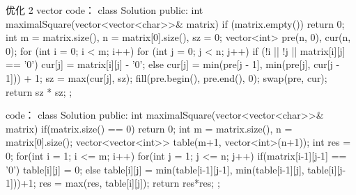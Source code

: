 优化 2 vector code：
class Solution {
public:
    int maximalSquare(vector<vector<char>>& matrix) {
        if (matrix.empty()) {
            return 0;
        }
        int m = matrix.size(), n = matrix[0].size(), sz = 0;
        vector<int> pre(n, 0), cur(n, 0);
        for (int i = 0; i < m; i++) {
            for (int j = 0; j < n; j++) {
                if (!i || !j || matrix[i][j] == '0') {
                    cur[j] = matrix[i][j] - '0';
                } else {
                    cur[j] = min(pre[j - 1], min(pre[j], cur[j - 1])) + 1;
                }
                sz = max(cur[j], sz);
            }
            fill(pre.begin(), pre.end(), 0);
            swap(pre, cur);
        }
        return sz * sz;
    }
};
























code：
class Solution {
public:
    int maximalSquare(vector<vector<char>>& matrix) {
        if(matrix.size() == 0) return 0;
        int m = matrix.size(), n = matrix[0].size();
        vector<vector<int>> table(m+1, vector<int>(n+1));
        int res = 0;
        for(int i = 1; i <= m; i++)
        {
            for(int j = 1; j <= n; j++)
            {
                if(matrix[i-1][j-1] == '0') table[i][j] = 0;
                else
                {
                    table[i][j] = min(table[i-1][j-1], min(table[i-1][j], table[i][j-1]))+1;
                    res = max(res, table[i][j]);
                }
            }
        }
        return res*res;
    }
};